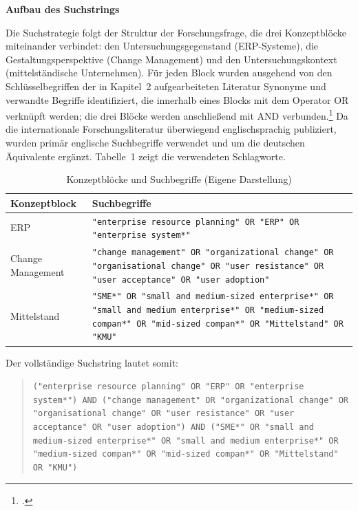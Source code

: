 \textbf{Aufbau des Suchstrings}

Die Suchstrategie folgt der Struktur der Forschungsfrage, die drei Konzeptbl\"ocke miteinander verbindet: den Untersuchungsgegenstand (ERP-Systeme), die Gestaltungsperspektive (Change Management) und den Untersuchungskontext (mittelst\"andische Unternehmen). F\"ur jeden Block wurden ausgehend von den Schl\"usselbegriffen der in Kapitel~2 aufgearbeiteten Literatur Synonyme und verwandte Begriffe identifiziert, die innerhalb eines Blocks mit dem Operator OR verkn\"upft werden; die drei Bl\"ocke werden anschlie\ss{}end mit AND verbunden.\footcite[Vgl.][S.~8--9]{vombrocke2009} Da die internationale Forschungsliteratur \"uberwiegend englischsprachig publiziert, wurden prim\"ar englische Suchbegriffe verwendet und um die deutschen \"Aquivalente erg\"anzt. Tabelle~1 zeigt die verwendeten Schlagworte.

\begin{table}[H]
\centering
\begin{tabularx}{\textwidth}{lX}
\toprule
\textbf{Konzeptblock} & \textbf{Suchbegriffe} \\
\midrule
ERP & \texttt{"enterprise resource planning" OR "ERP" OR "enterprise system*"} \\
Change Management & \texttt{"change management" OR "organizational change" OR "organisational change" OR "user resistance" OR "user acceptance" OR "user adoption"} \\
Mittelstand & \texttt{"SME*" OR "small and medium-sized enterprise*" OR "small and medium enterprise*" OR "medium-sized compan*" OR "mid-sized compan*" OR "Mittelstand" OR "KMU"} \\
\bottomrule
\end{tabularx}
\caption{Konzeptbl\"ocke und Suchbegriffe (Eigene Darstellung)}
\label{tab:suchbegriffe}
\end{table}

Der vollst\"andige Suchstring lautet somit:

\begin{quote}
\texttt{("enterprise resource planning" OR "ERP" OR "enterprise system*") AND ("change management" OR "organizational change" OR "organisational change" OR "user resistance" OR "user acceptance" OR "user adoption") AND ("SME*" OR "small and medium-sized enterprise*" OR "small and medium enterprise*" OR "medium-sized compan*" OR "mid-sized compan*" OR "Mittelstand" OR "KMU")}
\end{quote}

